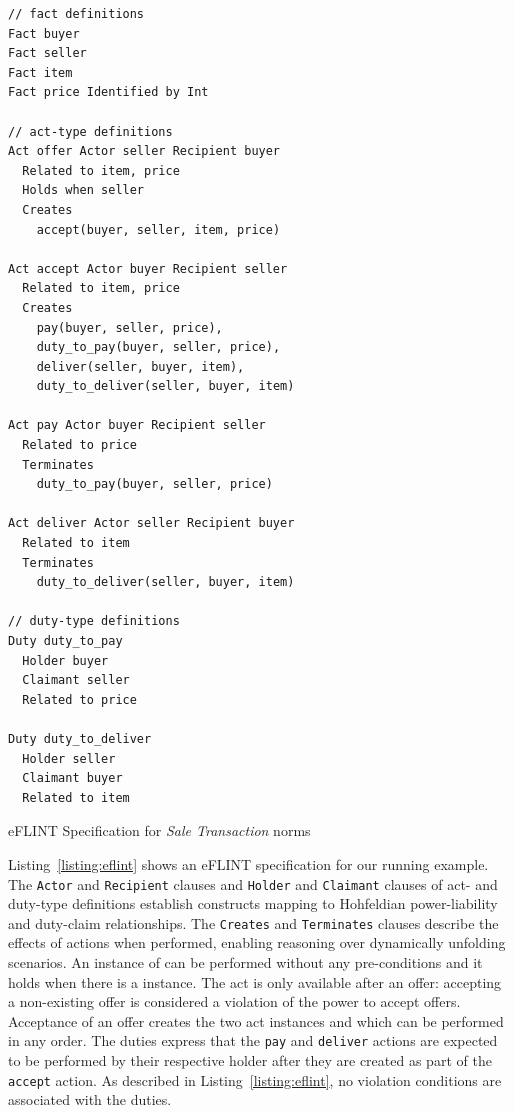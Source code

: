 %
\begin{listing}[!ht]
  \centering
\begin{minipage}{1\textwidth}
  \centering
\begin{tcolorbox}[left=2pt,right=2pt,top=2pt,bottom=2pt,arc=0pt,
                  boxrule=0pt,toprule=1pt,
                  colback=white]
\begin{verbatim}
// fact definitions
Fact buyer 
Fact seller
Fact item
Fact price Identified by Int 

// act-type definitions
Act offer Actor seller Recipient buyer
  Related to item, price
  Holds when seller
  Creates 
    accept(buyer, seller, item, price)

Act accept Actor buyer Recipient seller
  Related to item, price
  Creates 
    pay(buyer, seller, price),
    duty_to_pay(buyer, seller, price),
    deliver(seller, buyer, item),
    duty_to_deliver(seller, buyer, item)

Act pay Actor buyer Recipient seller
  Related to price
  Terminates 
    duty_to_pay(buyer, seller, price)

Act deliver Actor seller Recipient buyer
  Related to item
  Terminates
    duty_to_deliver(seller, buyer, item)

// duty-type definitions
Duty duty_to_pay 
  Holder buyer
  Claimant seller
  Related to price

Duty duty_to_deliver
  Holder seller
  Claimant buyer
  Related to item
\end{verbatim}
\end{tcolorbox}
\end{minipage}%
\caption{eFLINT Specification for \textit{Sale Transaction} norms}
\label{listing:eflint}
\end{listing}


%
Listing~\ref{listing:eflint} shows an eFLINT specification for our running example.
%
The \texttt{Actor} and \texttt{Recipient} clauses and \texttt{Holder} and \texttt{Claimant} clauses of act- and duty-type definitions establish constructs mapping to Hohfeldian power-liability and duty-claim relationships.
%
The \texttt{Creates} and \texttt{Terminates} clauses describe the effects of actions when performed, enabling reasoning over dynamically unfolding scenarios.
%
An instance of  can be performed without any pre-conditions and it holds when there is a  instance. 
%
The act  is only available after an offer: accepting a non-existing offer is considered a violation of the power to accept offers.
%
Acceptance of an offer creates the two act instances  and  which can be performed in any order.
%
The duties express that the \texttt{pay} and \texttt{deliver} actions are expected to be performed by their respective holder after they are created as part of the \texttt{accept} action.
%
As described in Listing~\ref{listing:eflint}, no violation conditions are associated with the duties.
%

